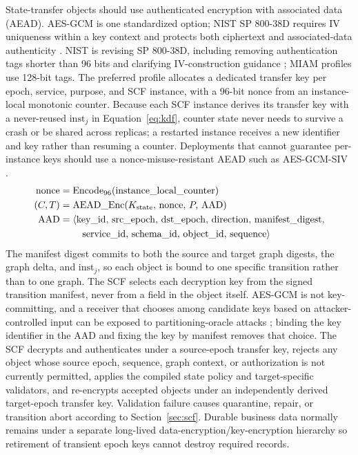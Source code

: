 \documentclass[11pt,letterpaper]{article}
\begin{document}
State-transfer objects should use authenticated encryption with associated data (AEAD). AES-GCM is one standardized option; NIST SP 800-38D requires IV uniqueness within a key context and protects both ciphertext and associated-data authenticity \cite{nist80038d}. NIST is revising SP 800-38D, including removing authentication tags shorter than 96 bits and clarifying IV-construction guidance \cite{nist80038dr1}; MIAM profiles use 128-bit tags. The preferred profile allocates a dedicated transfer key per epoch, service, purpose, and SCF instance, with a 96-bit nonce from an instance-local monotonic counter. Because each SCF instance derives its transfer key with a never-reused $\mathrm{inst}_j$ in Equation~\eqref{eq:kdf}, counter state never needs to survive a crash or be shared across replicas; a restarted instance receives a new identifier and key rather than resuming a counter. Deployments that cannot guarantee per-instance keys should use a nonce-misuse-resistant AEAD such as AES-GCM-SIV \cite{rfc8452}.
\begin{align}
\mathrm{nonce}&=\mathrm{Encode}_{96}(\mathrm{instance\_local\_counter})\\
(C,T)&=\mathrm{AEAD\_Enc}(K_{\mathrm{state}},\,\mathrm{nonce},\,P,\,\mathrm{AAD})\\
\mathrm{AAD}&=\langle\mathrm{key\_id},\,\mathrm{src\_epoch},\,\mathrm{dst\_epoch},\,\mathrm{direction},\,\mathrm{manifest\_digest},\notag\\
&\qquad\ \mathrm{service\_id},\,\mathrm{schema\_id},\,\mathrm{object\_id},\,\mathrm{sequence}\rangle
\end{align}
The manifest digest commits to both the source and target graph digests, the graph delta, and $\mathrm{inst}_j$, so each object is bound to one specific transition rather than to one graph. The SCF selects each decryption key from the signed transition manifest, never from a field in the object itself. AES-GCM is not key-committing, and a receiver that chooses among candidate keys based on attacker-controlled input can be exposed to partitioning-oracle attacks \cite{len2021}; binding the key identifier in the AAD and fixing the key by manifest removes that choice. The SCF decrypts and authenticates under a source-epoch transfer key, rejects any object whose source epoch, sequence, graph context, or authorization is not currently permitted, applies the compiled state policy and target-specific validators, and re-encrypts accepted objects under an independently derived target-epoch transfer key. Validation failure causes quarantine, repair, or transition abort according to Section~\ref{sec:scf}. Durable business data normally remains under a separate long-lived data-encryption/key-encryption hierarchy so retirement of transient epoch keys cannot destroy required records.
\end{document}
